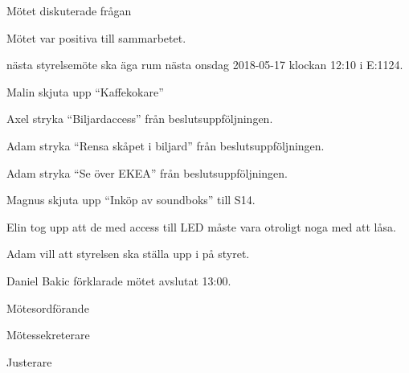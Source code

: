 \documentclass[10pt]{article}
\def\mo{Daniel Bakic}
\def\ms{Axel Voss}
\def\ji{Adam Belfrage}
\begin{document}
\begin{paragrafer}
	Mötet diskuterade frågan 

	Mötet var positiva till sammarbetet.

	\Mba nästa styrelsemöte ska äga rum nästa onsdag 2018-05-17 klockan 12:10 i E:1124.
	  
	
	
	Malin \ypa skjuta upp ``Kaffekokare''

	\Mbaby 
	
	Axel \ypa stryka ``Biljardaccess'' från beslutsuppföljningen.

	\Mbaby 
	
	Adam \ypa stryka ``Rensa skåpet i biljard'' från beslutsuppföljningen.

	\Mbaby 
	
	Adam \ypa stryka ``Se över EKEA'' från beslutsuppföljningen.
	
	\Mbaby 
	
	Magnus \ypa skjuta upp ``Inköp av soundboks'' till S14.
	
	\Mbaby 	
	
	Elin tog upp att de med access till LED måste vara otroligt noga med att låsa.
	
	Adam vill att styrelsen ska ställa upp i på styret. 


	{\mo} förklarade mötet avslutat 13:00.
\end{paragrafer}

\hidesignfoot
\begin{signatures}{3}
	\signature{\mo}{Mötesordförande}
	\signature{\ms}{Mötessekreterare}
	\signature{\ji}{Justerare}
\end{signatures}
\end{document}
